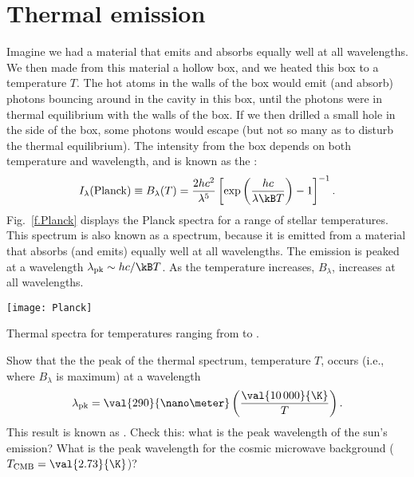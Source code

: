 \section{Thermal emission}
\label{s.thermal-emission}

Imagine we had a material that emits and absorbs equally well at all wavelengths. We then made from this material a hollow box, and we heated this box to a temperature $T$. The hot atoms in the walls of the box would emit (and absorb) photons bouncing around in the cavity in this box, until the photons were in thermal equilibrium with the walls of the box. If we then drilled a small hole in the side of the box, some photons would escape (but not so many as to disturb the thermal equilibrium). The intensity from the box depends on both temperature and wavelength, and is known as the :
\begin{equation}\label{e.planck-spectrum-wavelength}
I_{\lambda}(\mathrm{Planck}) \equiv B_{\lambda}(T) = \frac{2hc^{2}}{\lambda^{5}} \left[\exp\left(\frac{hc}{\lambda\kB T}\right)-1\right]^{-1}.
\end{equation}
Fig.~\ref{f.Planck} displays the Planck spectra for a range of stellar temperatures. This spectrum is also known as a  spectrum, because it is emitted from a material that absorbs (and emits) equally well at all wavelengths. The emission is peaked at a wavelength $\lambda_{\mathrm{pk}} \sim hc/\kB T$. As the temperature increases, $B_{\lambda}$, increases at all wavelengths.
\begin{marginfigure}[-12\baselineskip]
\texttt{[image: Planck]}
\caption{\label{f.Planck}Thermal spectra for temperatures ranging from  to .}
\end{marginfigure}

\begin{exercisebox}\label{ex.Wien-wavelength}
Show that the the peak of the thermal spectrum, temperature $T$, occurs (i.e., where $B_{\lambda}$ is maximum) at a wavelength
\[ \lambda_{\mathrm{pk}} = \val{290}{\nano\meter}\left(\frac{\val{10\,000}{\K}}{T}\right). \]
This result is known as . Check this: what is the peak wavelength of the sun's emission? What is the peak wavelength for the cosmic microwave background ($T_{\mathrm{CMB}} = \val{2.73}{\K}$)?
\end{exercisebox}

